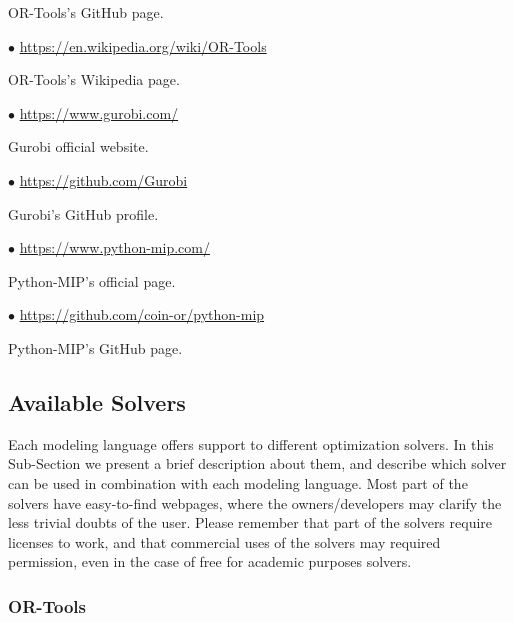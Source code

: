 \documentclass[12pt,hidelinks]{article}
\begin{document}
		OR-Tools's GitHub page.

		$\bullet$ \url{https://en.wikipedia.org/wiki/OR-Tools}

		OR-Tools's Wikipedia page.

		$\bullet$ \url{https://www.gurobi.com/}

		Gurobi official website.

		$\bullet$ \url{https://github.com/Gurobi}

		Gurobi's GitHub profile.

		$\bullet$ \url{https://www.python-mip.com/}

		Python-MIP's official page.

		$\bullet$ \url{https://github.com/coin-or/python-mip}

		Python-MIP's GitHub page.

	\subsection{Available Solvers}

	Each modeling language offers support to different optimization solvers. In this Sub-Section we present a brief description about them, and describe which solver can be used in combination with each modeling language. Most part of the solvers have easy-to-find webpages, where the owners/developers may clarify the less trivial doubts of the user. Please remember that part of the solvers require licenses to work, and that commercial uses of the solvers may required permission, even in the case of free for academic purposes solvers.

	\subsubsection{OR-Tools}
\end{document}
